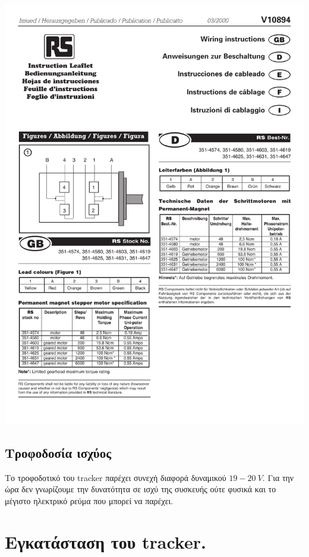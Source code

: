 \documentclass[
  a4paper,
  twoside,
  titlepage,
  12pt]{article}
\numberwithin{equation}{section}
\numberwithin{figure}{section}
\numberwithin{table}{section}
\begin{document}
\begin{center}\includegraphics[width=1\linewidth]{./files/FWmotor_wiring} \end{center}

\hypertarget{ux3c4ux3c1ux3bfux3c6ux3bfux3b4ux3bfux3c3ux3afux3b1-ux3b9ux3c3ux3c7ux3cdux3bfux3c2}{%
\subsection{Τροφοδοσία ισχύος}\label{ux3c4ux3c1ux3bfux3c6ux3bfux3b4ux3bfux3c3ux3afux3b1-ux3b9ux3c3ux3c7ux3cdux3bfux3c2}}

Το τροφοδοτικό του tracker παρέχει συνεχή διαφορά δυναμικού \(19-20\ V\). Για την ώρα δεν γνωρίζουμε την δυνατότητα σε ισχύ της συσκευής ούτε φυσικά και το μέγιστο ηλεκτρικό ρεύμα που μπορεί να παρέχει.

\newpage

\hypertarget{trackerinstallation}{%
\section{Εγκατάσταση του tracker.}\label{trackerinstallation}}
\end{document}
